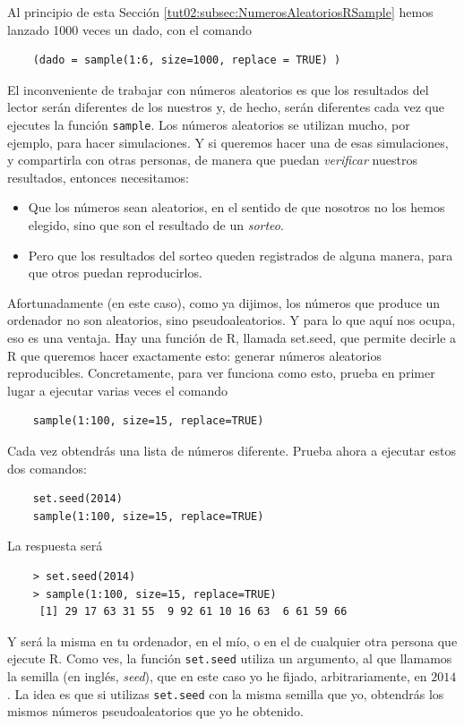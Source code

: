 \documentclass[10pt,a4paper]{article}\usepackage[]{graphicx}\usepackage[]{color}
\begin{document}
Al principio de esta Sección \ref{tut02:subsec:NumerosAleatoriosRSample} hemos lanzado 1000 veces un dado,  con el comando
\begin{verbatim}
    (dado = sample(1:6, size=1000, replace = TRUE) )
\end{verbatim}
El inconveniente de trabajar con números aleatorios es que los resultados del lector serán diferentes de los nuestros y, de hecho, serán diferentes cada vez que ejecutes la función {\tt sample}. Los números aleatorios se utilizan mucho, por ejemplo, para hacer simulaciones. Y si queremos hacer una de esas simulaciones, y compartirla con otras personas, de manera que puedan {\em verificar} nuestros resultados, entonces necesitamos:
\begin{itemize}
  \item Que los números sean aleatorios, en el sentido de que nosotros no los hemos elegido, sino que son el resultado de un {\em sorteo}.
  \item Pero que los resultados del sorteo queden registrados de alguna manera, para que otros puedan reproducirlos.
\end{itemize}
Afortunadamente (en este caso), como ya dijimos, los números que produce un ordenador no son aleatorios, sino pseudoaleatorios. Y para lo que aquí nos ocupa, eso es una ventaja. Hay una función de R, llamada {\sf set.seed}, que permite decirle a R que queremos hacer exactamente esto: generar números aleatorios reproducibles. Concretamente, para ver funciona como esto, prueba en primer lugar a ejecutar varias veces el comando
\begin{verbatim}
    sample(1:100, size=15, replace=TRUE)
\end{verbatim}
Cada vez obtendrás una lista de números diferente. Prueba ahora a ejecutar estos dos comandos:
\begin{verbatim}
    set.seed(2014)
    sample(1:100, size=15, replace=TRUE)
\end{verbatim}
La respuesta será
\begin{verbatim}
    > set.seed(2014)
    > sample(1:100, size=15, replace=TRUE)
     [1] 29 17 63 31 55  9 92 61 10 16 63  6 61 59 66
\end{verbatim}
Y será la misma en tu ordenador, en el mío, o en el de cualquier otra persona que ejecute R. Como ves, la función {\tt set.seed} utiliza un argumento, al que llamamos la {\sf semilla} (en inglés, {\em seed}), que en este caso yo he fijado, arbitrariamente, en $2014$.  La idea es que si utilizas {\tt set.seed} con la misma semilla que yo, obtendrás los mismos números pseudoaleatorios que yo he obtenido.
\end{document}
